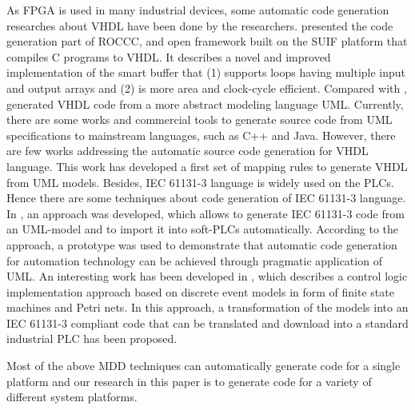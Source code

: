 As FPGA is used in many industrial devices, some automatic code generation researches about VHDL have been done by the researchers. \cite{guo2008efficient} presented the code generation part of ROCCC, and open framework built on the SUIF platform that compiles C programs to VHDL. It describes a novel and improved implementation of the smart buffer that (1) supports loops having multiple input and output arrays and (2) is more area and clock-cycle efficient. Compared with \cite{guo2008efficient}, \cite{moreira2010automatic} generated VHDL code from a more abstract modeling language UML. Currently, there are some works and commercial tools to generate source code from UML specifications to mainstream languages, such as C++ and Java. However, there are few works addressing the automatic source code generation for VHDL language. This work has developed a first set of mapping rules to generate VHDL from UML models. Besides, IEC 61131-3 language is widely used on the PLCs. Hence there are some techniques about code generation of IEC 61131-3 language. In \cite{vogel2005automatic}, an approach was developed, which allows to generate IEC 61131-3 code from an UML-model and to import it into soft-PLCs automatically. According to the approach, a prototype was used to demonstrate that automatic code  generation for automation technology can be achieved through pragmatic application of UML. An interesting work has been developed in \cite{music2005iec}, which describes a control logic implementation approach based on discrete event models in form of finite state machines and Petri nets. In this approach, a transformation of the models into an IEC 61131-3 compliant code that can be translated and download into a standard industrial PLC has been proposed.

Most of the above MDD techniques can automatically generate code for a single platform and our research in this paper is to generate code for a variety of different system platforms.


